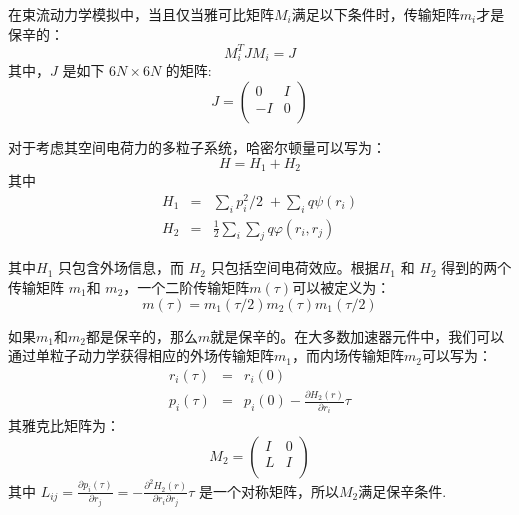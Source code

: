 {在束流动力学模拟中，当且仅当雅可比矩阵$M_i$满足以下条件时，传输矩阵$ m_i $才是保辛的\cite{accelerator2004lee, accelerator2013chao}：
\begin{equation}
M_{i}^{T}J{{M}_{i}}=J
\end{equation}
其中，$J$ 是如下 $6N\times6N$ 的矩阵:
\begin{equation}
J=\left(
  \begin{array}{cc}
     0 & I \\
    -I & 0 \\
  \end{array}
\right)
\end{equation}

对于考虑其空间电荷力的多粒子系统，哈密尔顿量可以写为：
\begin{equation}
H={{H}_{1}}+{{H}_{2}}
\end{equation}
其中
\begin{eqnarray}
  {H}_{1} &=& \sum\limits_{i}{{p_{i}^{2}}/{2}\;}+\sum\limits_{i}{q\psi ({{r}_{i}})} \\
  {H}_{2} &=& \frac{1}{2}\sum\limits_{i}{\sum\limits_{j}{q\varphi ({{r}_{i}},{{r}_{j}})}}
\end{eqnarray}

其中${{H}_{1}}$ 只包含外场信息，而 ${{H}_{2}}$ 只包括空间电荷效应。根据${{H}_{1}}$ 和 ${{H}_{2}}$ 得到的两个传输矩阵 ${{m}_{1}}$和 ${{m}_{2}}$，一个二阶传输矩阵$m\left( \tau  \right)$可以被定义为：
\begin{equation}
m\left( \tau  \right)={{m}_{1}}\left( \tau /2 \right){{m}_{2}}\left( \tau  \right){{m}_{1}}\left( \tau /2 \right)
\end{equation}

如果$ {{m} _ {1}} $和$ {{m} _ {2}} $都是保辛的，那么$ m $就是保辛的。在大多数加速器元件中，我们可以通过单粒子动力学获得相应的外场传输矩阵$ {{m} _ {1}} $，而内场传输矩阵$ {{m} _ {2}} $可以写为：
\begin{eqnarray}
 {{r}_{i}}(\tau ) &=& {{r}_{i}}(0) \\
 {{p}_{i}}(\tau ) &=& {{p}_{i}}(0)-\frac{\partial {{H}_{2}}(r)}{\partial {{r}_{i}}}\tau
\end{eqnarray}
其雅克比矩阵为：
\begin{equation}
{{M}_{2}}=\left(
\begin{array}{cc}
   I & 0  \\
   L & I  \\
\end{array} \right)
\end{equation}
其中
${{L}_{ij}}=\frac{\partial {{p}_{i}}(\tau )}{\partial {{r}_{j}}}=-\frac{{{\partial }^{2}}{{H}_{2}}(r)}{\partial {{r}_{i}}\partial {{r}_{j}}}\tau$
是一个对称矩阵，所以${{M}_{2}}$满足保辛条件.

}
